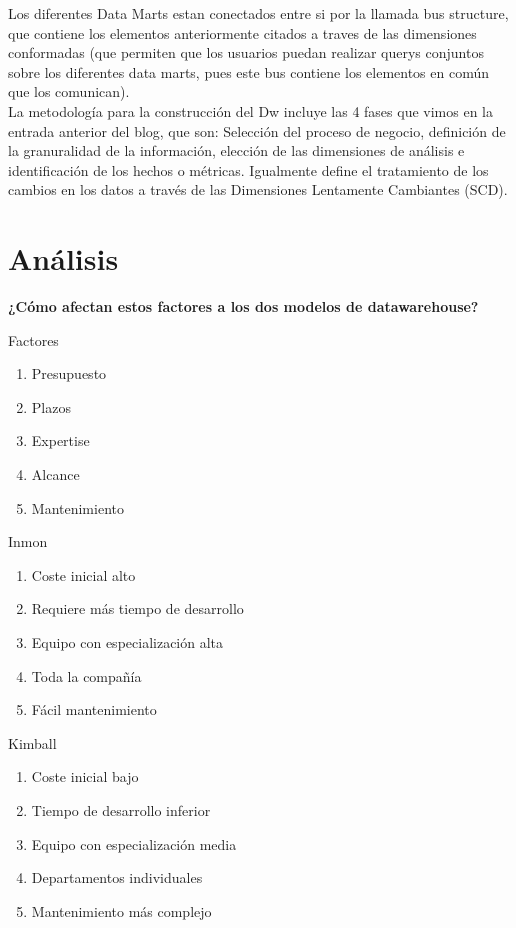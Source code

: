 \documentclass[11pt]{article}
\begin{document}
Los diferentes Data Marts estan conectados entre si por la llamada bus structure, que contiene los elementos anteriormente citados a traves de las dimensiones conformadas (que permiten que los usuarios puedan realizar querys conjuntos sobre los diferentes data marts, pues este bus contiene los elementos en común que los comunican).\\

La metodología para la construcción del Dw incluye las 4 fases que vimos en la entrada anterior del blog, que son: Selección del proceso de negocio, definición de la granuralidad de la información, elección de las dimensiones de análisis e identificación de los hechos o métricas. Igualmente define el tratamiento de los cambios en los datos a través de las Dimensiones Lentamente Cambiantes (SCD).



\section{Análisis}

{\bf ¿Cómo afectan estos factores a los dos modelos de datawarehouse? }

\large Factores
\begin{enumerate}
    \item Presupuesto
    \item Plazos
    \item Expertise
    \item Alcance
    \item Mantenimiento
\end{enumerate}

\large Inmon
\begin{enumerate}
    \item Coste inicial alto
    \item Requiere más tiempo de desarrollo
    \item Equipo con especialización alta
    \item Toda la compañía
    \item Fácil mantenimiento
\end{enumerate}

\large Kimball
\begin{enumerate}
    \item Coste inicial bajo
    \item Tiempo de desarrollo inferior
    \item Equipo con especialización media
    \item Departamentos individuales
    \item Mantenimiento más complejo
\end{enumerate}
\end{document}
